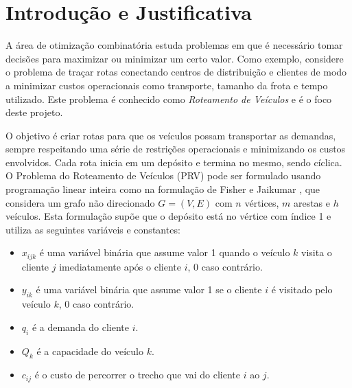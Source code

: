 \documentclass[12pt,a4paper]{article}
\newcommand{\blue}[1]{\textcolor{blue}{#1}}
\begin{document}
\section{Introdução e Justificativa}

A área de otimização combinatória estuda problemas em que é necessário tomar decisões para maximizar ou minimizar um certo valor. Como exemplo, considere o problema de traçar rotas conectando centros de distribuição e clientes de modo a minimizar custos operacionais como transporte, tamanho da frota e tempo utilizado. Este problema é conhecido como \textit{Roteamento de Veículos} e é o foco deste projeto. 

O objetivo é criar rotas para que os veículos possam transportar as demandas, sempre respeitando uma série de restrições operacionais e minimizando os custos envolvidos. Cada rota inicia em um depósito e termina no mesmo, sendo cíclica. O Problema do Roteamento de Veículos (PRV) pode ser formulado usando programação linear inteira como na formulação de Fisher e Jaikumar \cite{fisher1981generalized}, que considera um grafo não direcionado $G = (V, E)$ com $n$ vértices, $m$ arestas e $h$ veículos. Esta formulação supõe que o depósito está no vértice com índice 1 e utiliza as seguintes variáveis e constantes:\\
\begin{itemize}
\item $x_{ijk}$ é uma variável binária que assume valor 1 quando o veículo $k$ visita o cliente $j$ imediatamente após o cliente $i$, 0 caso contrário.
\item $y_{ik}$ é uma variável binária que assume valor 1 se o cliente $i$ é visitado pelo veículo $k$, 0 caso contrário.
\item $q_{i}$ é a demanda do cliente $i$.
\item $Q_{k}$ é a capacidade do veículo $k$.
\item $c_{ij}$ é o custo de percorrer o trecho que vai do cliente $i$ ao $j$.\\

\end{itemize}
\end{document}
